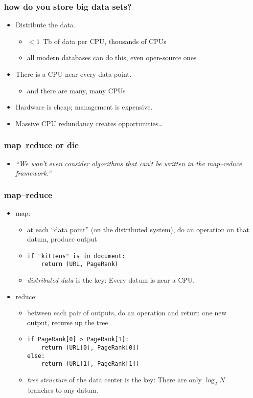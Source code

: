 \documentclass[pdftex]{beamer}
\begin{document}
\begin{frame}
  \frametitle{how do you store big data sets?}
  \begin{itemize}
  \item Distribute the data.
    \begin{itemize}
    \item $< 1$~Tb of data per CPU, thousands of CPUs
    \item all modern databases can do this, even open-source ones
    \end{itemize}
  \item There is a CPU near every data point.
    \begin{itemize}
    \item and there are many, many CPUs
    \end{itemize}
  \item Hardware is cheap; management is expensive.
  \item Massive CPU redundancy creates opportunities\ldots
  \end{itemize}
\end{frame}

\begin{frame}
  \frametitle{map--reduce or die}
  \begin{itemize}
  \item \textsl{``We won't even consider algorithms that can't be
    written in the map--reduce framework.''}
  \end{itemize}
\end{frame}

\begin{frame}
  \frametitle{map--reduce}
  \begin{itemize}
  \item map:
    \begin{itemize}
    \item at each ``data point'' (on the distributed system), do an
      operation on that datum, produce output
    \item \texttt{if "kittens" is in document: \\ ~~~~return (URL, PageRank)}
    \item \emph{distributed data} is the key: Every datum is near a
      CPU.
    \end{itemize}
  \item reduce:
    \begin{itemize}
    \item between each pair of outputs, do an operation and return one
      new output, recurse up the tree
    \item \texttt{if PageRank[0] > PageRank[1]: \\ ~~~~return (URL[0], PageRank[0]) \\ else: \\ ~~~~return (URL[1], PageRank[1])}
    \item \emph{tree structure} of the data center is the key: There are only
      $\log_2 N$ branches to any datum.
    \end{itemize}
  \end{itemize}
\end{frame}
\end{document}
